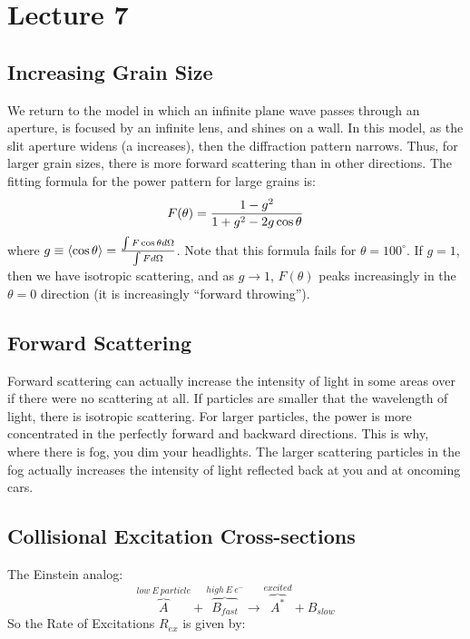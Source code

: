 \documentclass[11pt]{article}
\def\mean#1{\left\langle #1\right\rangle}
\begin{document}
\section*{ Lecture 7 }

\subsection*{ Increasing Grain Size}

We return to the model in which an infinite plane wave passes through an
aperture, is focused by an infinite lens, and shines on a wall.  In this
model, as the slit aperture widens (a increases), then the diffraction
pattern narrows.  Thus, for larger grain sizes, there is more forward
scattering than in other directions.  The fitting formula for the power
pattern for large grains is:
$$F(\theta)={1-g^2\over1+g^2-2g\cos\theta}$$
where $g\equiv\mean{\cos\theta}={\int{F\cos\theta d\Omega}\over
\int{Fd\Omega}}$. Note that this formula fails for $\theta=100^\circ$.  If
$g=1$, then we have isotropic scattering, and as $g\to1$, $F(\theta)$ peaks
increasingly in the $\theta=0$ direction (it is increasingly 
``forward throwing'').

\subsection*{ Forward Scattering}

Forward scattering can actually increase the intensity of light in some areas
over if there were no scattering at all.
If particles are smaller that the wavelength of light, there is isotropic
scattering.  For larger particles, the power is more concentrated in the 
perfectly forward and backward directions.  This is why, where there is fog,
you dim your headlights.  The larger scattering particles in the fog actually
increases the intensity of light reflected back at you and at oncoming cars.

\subsection*{ Collisional Excitation Cross-sections}

The Einstein analog:
$$\overbrace{A}^{low\ E\ particle} + \overbrace{B_{fast}}^{high\ E\ e^-}
\to \overbrace{A^*}^{excited} + B_{slow}$$
So the Rate of Excitations $R_{ex}$ is given by:
\end{document}
